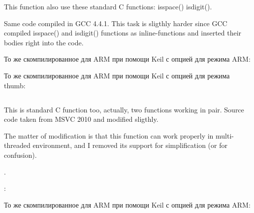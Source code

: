 {This function also use these standard C functions:} isspace() \AndENRU isdigit().



{Same code compiled in GCC 4.4.1. This task is sligthly harder since GCC compiled isspace() and isdigit()
functions as inline-functions and inserted their bodies right into the code.}



То же скомпилированное для ARM при помощи Keil с опцией \Othree для режима ARM:



То же скомпилированное для ARM при помощи Keil с опцией \Othree для режима thumb:



\subsection{}

{This is standard C function too, actually, two functions working in pair.
Source code taken from MSVC 2010 and modified sligthly.}

{The matter of modification is that this function can work properly in multi-threaded environment,
and I removed its support for simplification (or for confusion).}

.



:



То же скомпилированное для ARM при помощи Keil с опцией \Othree для режима ARM:



